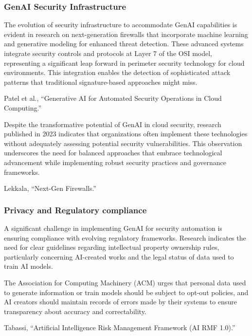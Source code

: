 \subsubsection{GenAI Security Infrastructure} %
\label{sec:GenAI Security Infrastructure}

The evolution of security infrastructure to accommodate GenAI capabilities is evident in research on next-generation firewalls that incorporate machine learning and generative modeling for enhanced threat detection. These advanced systems integrate security controls and protocols at Layer 7 of the OSI model, representing a significant leap forward in perimeter security technology for cloud environments. This integration enables the detection of sophisticated attack patterns that traditional signature-based approaches might miss.

Patel et al., “Generative AI for Automated Security Operations in Cloud Computing.”

Despite the transformative potential of GenAI in cloud security, research published in 2023 indicates that organizations often implement these technologies without adequately assessing potential security vulnerabilities. This observation underscores the need for balanced approaches that embrace technological advancement while implementing robust security practices and governance frameworks.

Lekkala, “Next-Gen Firewalls.”


\subsubsection{Privacy and Regulatory compliance} %
\label{sec:Privacy and Regulatory compliance}

A significant challenge in implementing GenAI for security automation is ensuring compliance with evolving regulatory frameworks. Research indicates the need for clear guidelines regarding intellectual property ownership rules, particularly concerning AI-created works and the legal status of data used to train AI models.

The Association for Computing Machinery (ACM) urges that personal data used to generate information or train models should be subject to opt-out policies, and AI creators should maintain records of errors made by their systems to ensure transparency about accuracy and correctability.

Tabassi, “Artificial Intelligence Risk Management Framework (AI RMF 1.0).”

